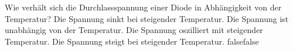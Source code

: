     {Wie verhält sich die Durchlassspannung einer Diode in Abhängigkeit von der Temperatur?}
    {Die Spannung sinkt bei steigender Temperatur.}
    {Die Spannung ist unabhängig von der Temperatur.}
    {Die Spannung oszilliert mit steigender Temperatur.}
    {Die Spannung steigt bei steigender Temperatur.}
    {false}{false}